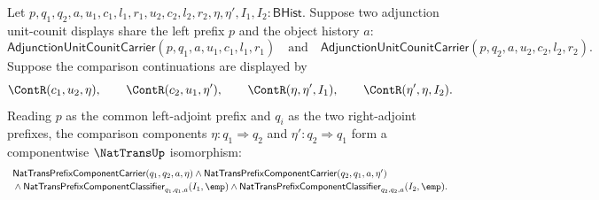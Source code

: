 \begin{theorem}
\label{thm:adjunction-right-adjoint-uniqueness-natural-isomorphism}
Let $p,q_1,q_2,a,u_1,c_1,l_1,r_1,u_2,c_2,l_2,r_2,\eta,\eta',I_1,I_2:\mathsf{BHist}$.
Suppose two adjunction unit-counit displays share the left prefix $p$ and the object history $a$:
$$
\mathsf{AdjunctionUnitCounitCarrier}(p,q_1,a,u_1,c_1,l_1,r_1)
\quad\text{and}\quad
\mathsf{AdjunctionUnitCounitCarrier}(p,q_2,a,u_2,c_2,l_2,r_2).
$$
Suppose the comparison continuations are displayed by
$$
\ContR(c_1,u_2,\eta),\qquad
\ContR(c_2,u_1,\eta'),\qquad
\ContR(\eta,\eta',I_1),\qquad
\ContR(\eta',\eta,I_2).
$$
Reading $p$ as the common left-adjoint prefix and $q_i$ as the two right-adjoint prefixes, the comparison components $\eta:q_1\Rightarrow q_2$ and $\eta':q_2\Rightarrow q_1$ form a componentwise $\NatTransUp$ isomorphism:
$$
\begin{array}{l}
\mathsf{NatTransPrefixComponentCarrier}(q_1,q_2,a,\eta)\land
\mathsf{NatTransPrefixComponentCarrier}(q_2,q_1,a,\eta')\\[2pt]
{}\land
\mathsf{NatTransPrefixComponentClassifier}_{q_1,q_1,a}(I_1,\emp)
\land
\mathsf{NatTransPrefixComponentClassifier}_{q_2,q_2,a}(I_2,\emp).
\end{array}
$$
\end{theorem}
